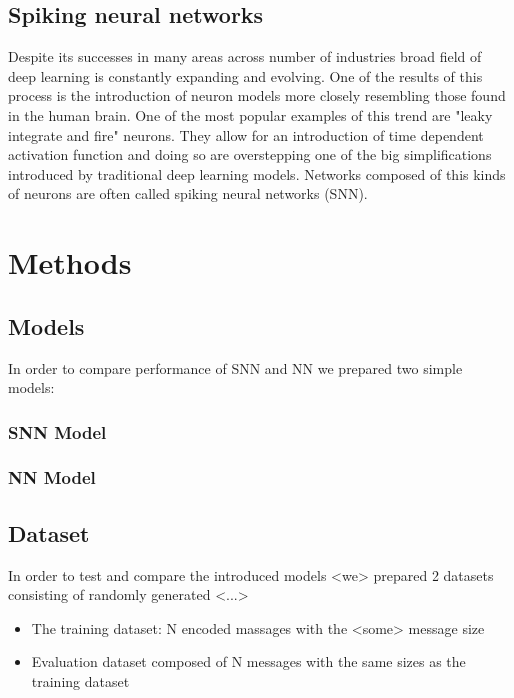 \documentclass{article}
\begin{document}
\subsection{Spiking neural networks}

Despite its successes in many areas across number of industries broad field of deep learning is constantly expanding and evolving. One of the results of this process is the introduction of neuron models more closely resembling those found in the human brain. One of the most popular examples of this trend are "leaky integrate and fire" neurons. They allow for an introduction of time dependent activation function and doing so are overstepping one of the big simplifications introduced by traditional deep learning models. Networks composed of this kinds of neurons are often called spiking neural networks (SNN).

\section{Methods}
\subsection{Models}

In order to compare performance of SNN and NN we prepared two simple models:

\subsubsection{SNN Model}
\subsubsection{NN Model}

\subsection{Dataset}

In order to test and compare the introduced models <we> prepared 2 datasets consisting of randomly generated <...>

\begin{itemize}
    \item The training dataset: N encoded massages with the <some> message size
    \item Evaluation dataset composed of N messages with the same sizes as the training dataset
\end{itemize}
\end{document}
